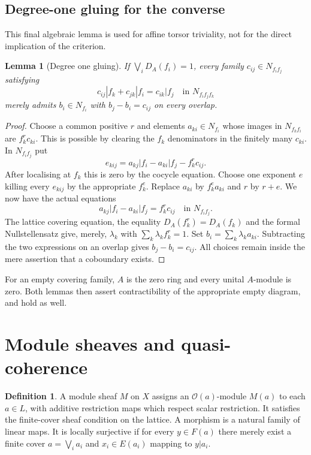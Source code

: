 \documentclass[11pt]{amsart}
\newtheorem{lemma}[theorem]{Lemma}
\theoremstyle{definition}\newtheorem{definition}[theorem]{Definition}
\theoremstyle{remark}\newtheorem{remark}[theorem]{Remark}
\newcommand{\OO}{\mathcal O}
\begin{document}
\subsection*{Degree-one gluing for the converse}
This final algebraic lemma is used for affine torsor triviality,
not for the direct implication of the criterion.

\begin{lemma}[Degree one gluing]\label{lem:h1affine}
If $\bigvee_iD_A(f_i)=1$, every family
$c_{ij}\in N_{f_i f_j}$ satisfying
\[
 c_{ij}|f_k+c_{jk}|f_i=c_{ik}|f_j
 \quad\text{in }N_{f_i f_j f_k}
\]
merely admits $b_i\in N_{f_i}$ with $b_j-b_i=c_{ij}$ on every
overlap.
\end{lemma}
\begin{proof}
Choose a common positive $r$ and elements $a_{ki}\in N_{f_i}$
whose images in $N_{f_k f_i}$ are $f_k^r c_{ki}$. This is possible
by clearing the $f_k$ denominators in the finitely many $c_{ki}$.
In $N_{f_i f_j}$ put
\[
 e_{kij}=a_{kj}|f_i-a_{ki}|f_j-f_k^r c_{ij}.
\]
After localising at $f_k$ this is zero by the cocycle equation.
Choose one exponent $e$ killing every $e_{kij}$ by the appropriate
$f_k^e$. Replace $a_{ki}$ by $f_k^e a_{ki}$ and $r$ by $r+e$.
We now have the actual equations
\[
 a_{kj}|f_i-a_{ki}|f_j=f_k^r c_{ij}
 \quad\text{in }N_{f_i f_j}.
\]
The lattice covering equation, the equality $D_A(f_k^r)=D_A(f_k)$
and the formal Nullstellensatz give, merely, $\lambda_k$ with
$\sum_k\lambda_k f_k^r=1$. Set
$b_i=\sum_k\lambda_k a_{ki}$. Subtracting the two expressions on
an overlap gives $b_j-b_i=c_{ij}$. All choices remain inside the
mere assertion that a coboundary exists.
\end{proof}

For an empty covering family, $A$ is the zero ring and every unital
$A$-module is zero. Both lemmas then assert contractibility of the
appropriate empty diagram, and hold as well.

\section{Module sheaves and quasi-coherence}\label{sec:modules}
\begin{definition}
A module sheaf $M$ on $X$ assigns an $\OO(a)$-module $M(a)$ to
each $a\in L$, with additive restriction maps which respect scalar
restriction. It satisfies the finite-cover sheaf condition on the
lattice. A morphism is a natural family of linear maps. It is locally
surjective if for every $y\in F(a)$ there merely exist a finite cover
$a=\bigvee_i a_i$ and $x_i\in E(a_i)$ mapping to $y|a_i$.
\end{definition}
\end{document}
